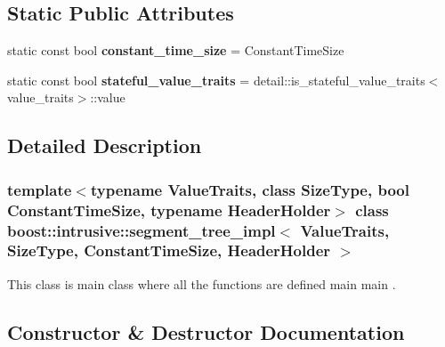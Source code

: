 \subsection*{Static Public Attributes}
\begin{DoxyCompactItemize}
\item 
\mbox{\label{classboost_1_1intrusive_1_1segment__tree__impl_a1c218f245dff93af18a0c42b61220289}} 
static const bool {\bfseries constant\+\_\+time\+\_\+size} = Constant\+Time\+Size
\item 
\mbox{\label{classboost_1_1intrusive_1_1segment__tree__impl_a008d7ccdb07d7b2423d29e5ef2014dca}} 
static const bool {\bfseries stateful\+\_\+value\+\_\+traits} = detail\+::is\+\_\+stateful\+\_\+value\+\_\+traits$<$value\+\_\+traits$>$\+::value
\end{DoxyCompactItemize}


\subsection{Detailed Description}
\subsubsection*{template$<$typename Value\+Traits, class Size\+Type, bool Constant\+Time\+Size, typename Header\+Holder$>$\newline
class boost\+::intrusive\+::segment\+\_\+tree\+\_\+impl$<$ Value\+Traits, Size\+Type, Constant\+Time\+Size, Header\+Holder $>$}

This class is main class where all the functions are defined main main . 

\subsection{Constructor \& Destructor Documentation}
\mbox{\label{classboost_1_1intrusive_1_1segment__tree__impl_abda73e6d62b92e32db5df65cb425ac59}} 
